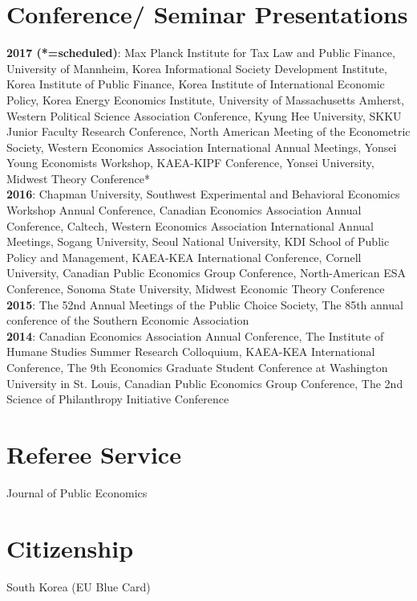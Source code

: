 \documentclass[margin]{res}
\begin{document}
\begin{resume}
\section{Conference/ Seminar Presentations}
\textbf{2017 (*=scheduled)}: Max Planck Institute for Tax Law and Public Finance, University of Mannheim, Korea Informational Society Development Institute, Korea Institute of Public Finance, Korea Institute of International Economic Policy, Korea Energy Economics Institute, University of Massachusetts Amherst, Western Political Science Association Conference, Kyung Hee University, SKKU Junior Faculty Research Conference, North American Meeting of the Econometric Society, Western Economics Association International Annual Meetings, Yonsei Young Economists Workshop, KAEA-KIPF Conference, Yonsei University, Midwest Theory Conference*\\
\textbf{2016}: Chapman University, Southwest Experimental and Behavioral Economics Workshop Annual Conference, Canadian Economics Association Annual Conference, Caltech, Western Economics Association International Annual Meetings, Sogang University, Seoul National University, KDI School of Public Policy and Management, KAEA-KEA International Conference, Cornell University, Canadian Public Economics Group Conference, North-American ESA Conference, Sonoma State University, Midwest Economic Theory Conference\\
\textbf{2015}: The 52nd Annual Meetings of the Public Choice Society, The 85th annual conference of the Southern Economic Association\\
\textbf{2014}: Canadian Economics Association Annual Conference, The Institute of Humane Studies Summer Research Colloquium, KAEA-KEA International Conference, The 9th Economics Graduate Student Conference at Washington University in St. Louis, Canadian Public Economics Group Conference, The 2nd Science of Philanthropy Initiative Conference


\section{Referee Service} Journal of Public Economics

\section{Citizenship} South Korea (EU Blue Card)%


\end{resume}
\end{document}
